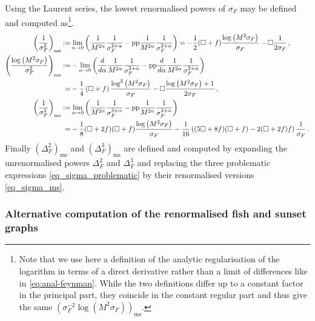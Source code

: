 \documentclass[a4paper,10pt,twoside]{article}
\numberwithin{equation}{section}
\newcounter{and}
\def\pp{\mathrm{pp}}
\def\ms{\mathrm{ms}}
\theoremstyle{plain}
\theoremstyle{definition}
\begin{document}
Using the Laurent series, the lowest renormalised powers of $\sigma_F$ may be defined and computed as\footnote{Note that we use here a definition of the analytic regularisation of the logarithm in terms of a direct derivative rather than a limit of differences like in \eqref{eq:anal-feynman}. While the two definitions differ up to a constant factor in the principal part, they coincide in the constant regular part and thus give the same $(
\sigma^{-2}_F \log (M^2 \sigma_F))_\ms$.}.
\begin{align}\left(\frac{1}{\sigma_F^2}\right)_\ms:=&\lim_{\alpha\to 0}\left(\frac{1}{M^{2\alpha}}\frac{1}{\sigma^{2+\alpha}_F}-\pp\frac{1}{M^{2\alpha}}\frac{1}{\sigma^{2+\alpha}_F}\right)=-\frac{1}{2}(\Box+f)\frac{\log \left(M^2 \sigma_F\right)}{\sigma_F}-\Box \frac{1}{2\sigma_F}\,,\notag\\
%
\label{eq_sigma_ms}\left(\frac{\log \left(M^2\sigma_F\right)}{\sigma_F^2}\right)_\ms:=&-\lim_{\alpha\to 0}\left(\frac{d}{d\alpha}\frac{1}{M^{2\alpha}}\frac{1}{\sigma^{2+\alpha}_F}-\pp\frac{d}{d\alpha}\frac{1}{M^{2\alpha}}\frac{1}{\sigma^{2+\alpha}_F}\right)\\=&-\frac14\left(\Box+f\right)\frac{\log^2 \left(M^2 \sigma_F\right)}{\sigma_F}-\Box\frac{\log \left(M^2 \sigma_F\right)+1}{2\sigma_F}\,,\notag\\
%
\left(\frac{1}{\sigma_F^3}\right)_\ms:=&\lim_{\alpha\to 0}\left(\frac{1}{M^{2\alpha}}\frac{1}{\sigma^{3+\alpha}_F}-\pp\frac{1}{M^{2\alpha}}\frac{1}{\sigma^{3+\alpha}_F}\right)\notag\\=&-\frac{1}{8}(\Box+2f)(\Box+f)\frac{\log \left(M^2 \sigma_F\right)}{\sigma_F}-\frac{1}{16} \left((5\Box+8f)(\Box+f)-2(\Box+2f)f\right) \frac{1}{\sigma_F}\,.\notag\end{align}
Finally $\left(\Delta^2_F\right)_\ms$ and $\left(\Delta^3_F\right)_\ms$ are defined and computed by expanding the unrenormalised powers $\Delta^2_F$ and $\Delta^3_F$ and replacing the three problematic expressions \eqref{eq_sigma_problematic} by their renormalised versions \eqref{eq_sigma_ms}.

\subsubsection{Alternative computation of the renormalised fish and sunset graphs}
\end{document}
